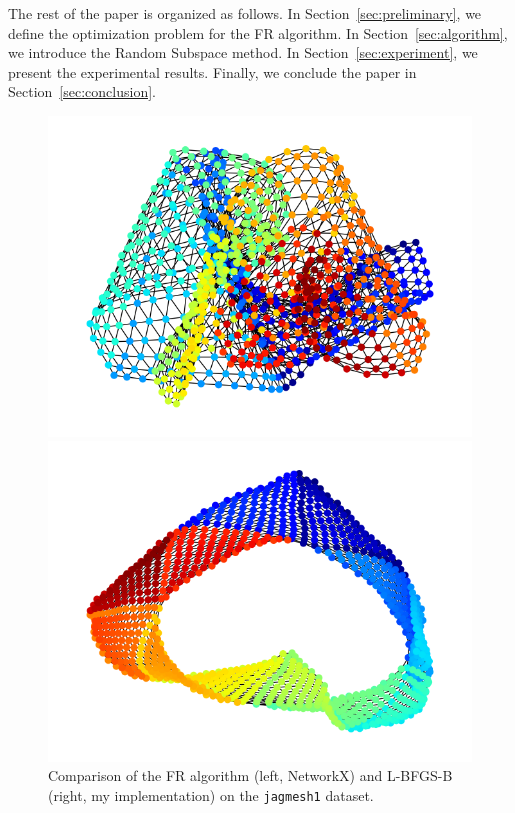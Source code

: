 \documentclass[journal]{IEEEtran}
\begin{document}
The rest of the paper is organized as follows. In Section~\ref{sec:preliminary}, we define the optimization problem for the FR algorithm. In Section~\ref{sec:algorithm}, we introduce the Random Subspace method. In Section~\ref{sec:experiment}, we present the experimental results. Finally, we conclude the paper in Section~\ref{sec:conclusion}.

\begin{figure}[t]
  \begin{minipage}{0.49\hsize}
    \centering
    \includegraphics[width=\columnwidth]{jagmesh1_FR_50iter.png}
  \end{minipage}
  \begin{minipage}{0.49\hsize}
    \centering
    \includegraphics[width=\columnwidth]{jagmesh1_BFGS_50iter.png}
  \end{minipage}
  \caption{Comparison of the FR algorithm (left, NetworkX) and L-BFGS-B (right, my implementation) on the \texttt{jagmesh1} dataset.}
\end{figure}
\end{document}
